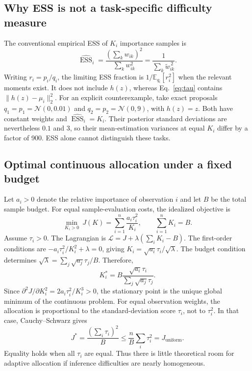 \documentclass[11pt,letterpaper]{article}
\newcommand{\E}{\mathbb E}
\newcommand{\N}{\mathcal N}
\newcommand{\norm}[1]{\lVert #1\rVert_2}
\newcommand{\ESS}{\operatorname{ESS}}
\begin{document}
\subsection{Why ESS is not a task-specific difficulty measure}
The conventional empirical ESS of $K_i$ importance samples is
\begin{equation}
 \widehat{\ESS}_i=\frac{(\sum_k w_{ik})^2}{\sum_k w_{ik}^2}=\frac{1}{\sum_k\widetilde w_{ik}^{\,2}}.
\end{equation}
Writing $r_i=p_i/q_i$, the limiting ESS fraction is $1/\E_{q_i}[r_i^2]$ when the relevant moments exist. It does not include $h(z)$, whereas Eq.~\eqref{eq:tau} contains $\norm{h(z)-\mu_i}^2$. For an explicit counterexample, take exact proposals $q_1=p_1=\N(0,0.01)$ and $q_2=p_2=\N(0,9)$, with $h(z)=z$. Both have constant weights and $\widehat{\ESS}_i=K_i$. Their posterior standard deviations are nevertheless $0.1$ and $3$, so their mean-estimation variances at equal $K_i$ differ by a factor of 900. ESS alone cannot distinguish these tasks.
\subsection{Optimal continuous allocation under a fixed budget}
Let $a_i>0$ denote the relative importance of observation $i$ and let $B$ be the total sample budget. For equal sample-evaluation costs, the idealized objective is
\begin{equation}
 \min_{K_i>0}\ J(K)=\sum_{i=1}^n\frac{a_i\tau_i^2}{K_i},\qquad \sum_{i=1}^n K_i=B.
 \label{eq:opt}
\end{equation}
Assume $\tau_i>0$. The Lagrangian is $\mathcal L=J+\lambda(\sum_i K_i-B)$. The first-order conditions are $-a_i\tau_i^2/K_i^2+\lambda=0$, giving $K_i=\sqrt{a_i}\tau_i/\sqrt\lambda$. The budget condition determines $\sqrt\lambda=\sum_j\sqrt{a_j}\tau_j/B$. Therefore,
\begin{equation}
 \boxed{K_i^*=B\frac{\sqrt{a_i}\tau_i}{\sum_j\sqrt{a_j}\tau_j}.}
 \label{eq:optimal}
\end{equation}
Since $\partial^2 J/\partial K_i^2=2a_i\tau_i^2/K_i^3>0$, the stationary point is the unique global minimum of the continuous problem. For equal observation weights, the allocation is proportional to the standard-deviation score $\tau_i$, not to $\tau_i^2$. In that case, Cauchy--Schwarz gives
\begin{equation}
 J^*=\frac{(\sum_i\tau_i)^2}{B}\leq \frac{n}{B}\sum_i\tau_i^2=J_{\mathrm{uniform}}.
\end{equation}
Equality holds when all $\tau_i$ are equal. Thus there is little theoretical room for adaptive allocation if inference difficulties are nearly homogeneous.
\end{document}
